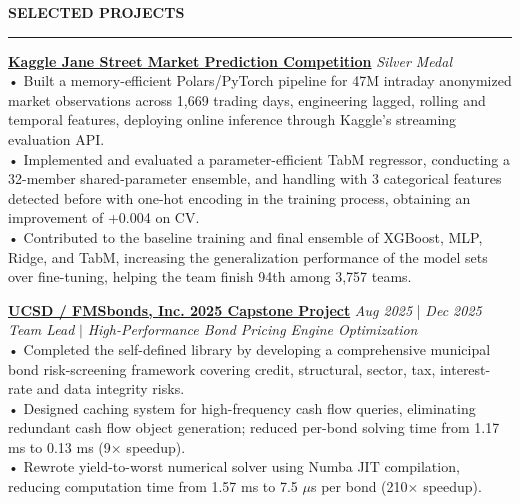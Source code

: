 \documentclass{resume} %
\renewcommand{\sectionskip}{\vspace{0.10cm}}        %
\renewcommand{\sectionlineskip}{\vspace{0.10cm}}
\renewenvironment{rSection}[1]{
\sectionskip
\textcolor{UC San Diego Blue}{\textbf{\large\bfseries\MakeUppercase{#1}}}

\sectionlineskip
\hrule
\begin{list}{}{
\setlength{\leftmargin}{0em}
}
\item[]
}{
\end{list}
}
\begin{document}
\begin{rSection}{SELECTED PROJECTS}

\noindent
\href{https://github.com/YuankaiTao-super/Kaggle2024-Jane-Street-Real-Time-Market-Data-Forecasting}{\textbf{Kaggle Jane Street Market Prediction Competition}} \hfill \textit{Silver Medal}\\
• Built a memory-efficient Polars/PyTorch pipeline for 47M intraday anonymized market observations across 1,669 trading days, engineering lagged, rolling and temporal features, deploying online inference through Kaggle's streaming evaluation API.\\[1.5pt]
• Implemented and evaluated a parameter-efficient TabM regressor, conducting a 32-member shared-parameter ensemble, and handling with 3 categorical features detected before with one-hot encoding in the training process, obtaining an improvement of +0.004 on CV.\\[1.5pt]
• Contributed to the baseline training and final ensemble of XGBoost, MLP, Ridge, and TabM, increasing the generalization performance of the model sets over fine-tuning, helping the team finish 94th among 3,757 teams.

\noindent
\href{https://github.com/YuankaiTao-super/Capstone_FMS_2025}{\textbf{UCSD / FMSbonds, Inc. 2025 Capstone Project}} \hfill {\em Aug 2025} | {\em Dec 2025}\\
\textit{Team Lead} $|$ \textit{High-Performance Bond Pricing Engine Optimization}\\[4pt]
• Completed the self-defined library by developing a comprehensive municipal bond risk-screening framework covering credit, structural, sector, tax, interest-rate and data integrity risks.\\[1.5pt]
• Designed caching system for high-frequency cash flow queries, eliminating redundant cash flow object generation; reduced per-bond solving time from 1.17 ms to 0.13 ms (9$\times$ speedup).\\[1.5pt]
• Rewrote yield-to-worst numerical solver using Numba JIT compilation, reducing computation time from 1.57 ms to 7.5 $\mu$s per bond (210$\times$ speedup).



\end{rSection}
\end{document}
